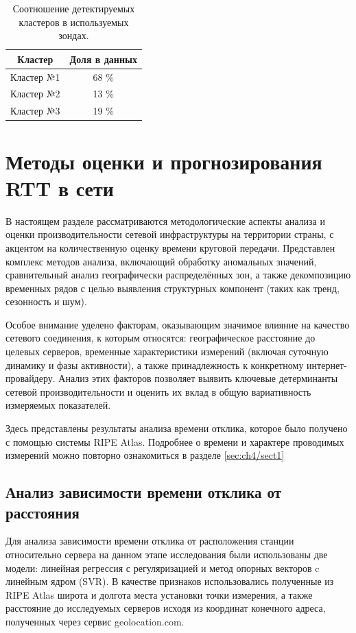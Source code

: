 \begin{table}[h!]
	\caption{Соотношение детектируемых кластеров в используемых зондах.}
	\centering
	\begin{tabular}{|c|c|}
		\hline
		Кластер     & Доля в данных \\ \hline
		Кластер №1  & 68 \%  	    \\ \hline
		Кластер №2  & 13 \% 	    \\ \hline
		Кластер №3  & 19 \%  	    \\ \hline
	\end{tabular}
	\label{tab:cluster_balance}
\end{table}



\section{Методы оценки и прогнозирования RTT в сети}\label{subsec:ch4/sect3}

В настоящем разделе рассматриваются методологические аспекты анализа и оценки производительности сетевой инфраструктуры на территории страны, с акцентом на количественную оценку времени круговой передачи. Представлен комплекс методов анализа, включающий обработку аномальных значений, сравнительный анализ географически распределённых зон, а также декомпозицию временных рядов с целью выявления структурных компонент (таких как тренд, сезонность и шум). 

Особое внимание уделено факторам, оказывающим значимое влияние на качество сетевого соединения, к которым относятся: географическое расстояние до целевых серверов, временные характеристики измерений (включая суточную динамику и фазы активности), а также принадлежность к конкретному интернет-провайдеру. Анализ этих факторов позволяет выявить ключевые детерминанты сетевой производительности и оценить их вклад в общую вариативность измеряемых показателей.

Здесь представлены результаты анализа времени отклика, которое было получено с помощью системы RIPE Atlas. Подробнее о времени и характере проводимых измерений можно повторно ознакомиться в разделе \ref{sec:ch4/sect1}


\subsection{Анализ зависимости времени отклика от расстояния}

Для анализа зависимости времени отклика от расположения станции относительно сервера на данном этапе исследования были использованы две модели: линейная регрессия с регуляризацией и метод опорных векторов c линейным ядром (SVR). В качестве признаков использовались полученные из RIPE Atlas широта и долгота места установки точки измерения, а также расстояние до исследуемых серверов исходя из координат конечного адреса, полученных через сервис geolocation.com.

